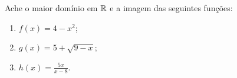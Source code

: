 Ache o maior domínio em $\mathbb{R}$ e a imagem das seguintes funções:
\begin{enumerate}
	\item $f(x)=4-x^2$;
	\item $g(x)=5+\sqrt{9-x}$;
	\item $h(x)=\frac{5x}{x-8}$.
\end{enumerate}

